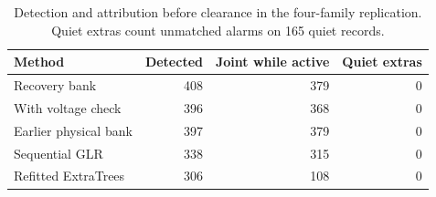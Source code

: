 \begin{table}[t]\centering\footnotesize
\caption{Detection and attribution before clearance in the four-family replication. Quiet extras count unmatched alarms on 165 quiet records.}
\label{tab:restoration-timing}\setlength{\tabcolsep}{3pt}
\begin{tabular*}{\columnwidth}{@{\extracolsep{\fill}}lrrr@{}}\toprule
Method & Detected & Joint while active & Quiet extras \\
\midrule
Recovery bank & 408 & 379 & 0 \\
With voltage check & 396 & 368 & 0 \\
Earlier physical bank & 397 & 379 & 0 \\
Sequential GLR & 338 & 315 & 0 \\
Refitted ExtraTrees & 306 & 108 & 0 \\
\bottomrule\end{tabular*}\end{table}

